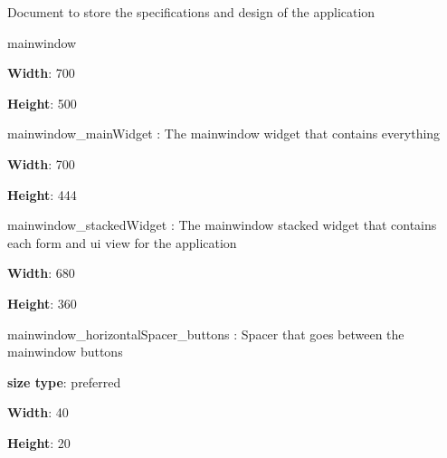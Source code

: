 Document to store the specifications and design of the application

{\ttfamily mainwindow}
\begin{DoxyItemize}
\item {\bfseries Width}\+: 700
\item {\bfseries Height}\+: 500
\end{DoxyItemize}

{\ttfamily mainwindow\+\_\+main\+Widget} \+: The mainwindow widget that contains everything
\begin{DoxyItemize}
\item {\bfseries Width}\+: 700
\item {\bfseries Height}\+: 444
\end{DoxyItemize}

{\ttfamily mainwindow\+\_\+stacked\+Widget} \+: The mainwindow stacked widget that contains each form and ui view for the application
\begin{DoxyItemize}
\item {\bfseries Width}\+: 680
\item {\bfseries Height}\+: 360
\end{DoxyItemize}

{\ttfamily mainwindow\+\_\+horizontal\+Spacer\+\_\+buttons} \+: Spacer that goes between the mainwindow buttons
\begin{DoxyItemize}
\item {\bfseries size type}\+: preferred
\item {\bfseries Width}\+: 40
\item {\bfseries Height}\+: 20 
\end{DoxyItemize}